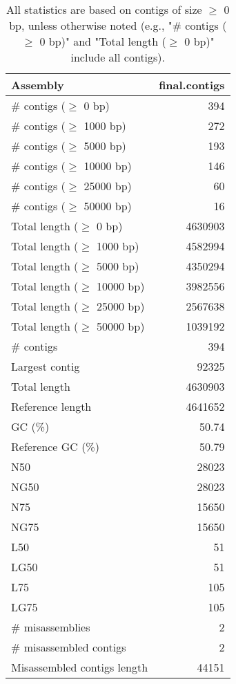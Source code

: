 \documentclass[12pt,a4paper]{article}
\begin{document}
\begin{table}[ht]
\begin{center}
\caption{All statistics are based on contigs of size $\geq$ 0 bp, unless otherwise noted (e.g., "\# contigs ($\geq$ 0 bp)" and "Total length ($\geq$ 0 bp)" include all contigs).}
\begin{tabular}{|l*{1}{|r}|}
\hline
Assembly & final.contigs \\ \hline
\# contigs ($\geq$ 0 bp) & 394 \\ \hline
\# contigs ($\geq$ 1000 bp) & 272 \\ \hline
\# contigs ($\geq$ 5000 bp) & 193 \\ \hline
\# contigs ($\geq$ 10000 bp) & 146 \\ \hline
\# contigs ($\geq$ 25000 bp) & 60 \\ \hline
\# contigs ($\geq$ 50000 bp) & 16 \\ \hline
Total length ($\geq$ 0 bp) & 4630903 \\ \hline
Total length ($\geq$ 1000 bp) & 4582994 \\ \hline
Total length ($\geq$ 5000 bp) & 4350294 \\ \hline
Total length ($\geq$ 10000 bp) & 3982556 \\ \hline
Total length ($\geq$ 25000 bp) & 2567638 \\ \hline
Total length ($\geq$ 50000 bp) & 1039192 \\ \hline
\# contigs & 394 \\ \hline
Largest contig & 92325 \\ \hline
Total length & 4630903 \\ \hline
Reference length & 4641652 \\ \hline
GC (\%) & 50.74 \\ \hline
Reference GC (\%) & 50.79 \\ \hline
N50 & 28023 \\ \hline
NG50 & 28023 \\ \hline
N75 & 15650 \\ \hline
NG75 & 15650 \\ \hline
L50 & 51 \\ \hline
LG50 & 51 \\ \hline
L75 & 105 \\ \hline
LG75 & 105 \\ \hline
\# misassemblies & 2 \\ \hline
\# misassembled contigs & 2 \\ \hline
Misassembled contigs length & 44151 \\ \hline

\end{tabular}
\end{center}
\end{table}
\end{document}
